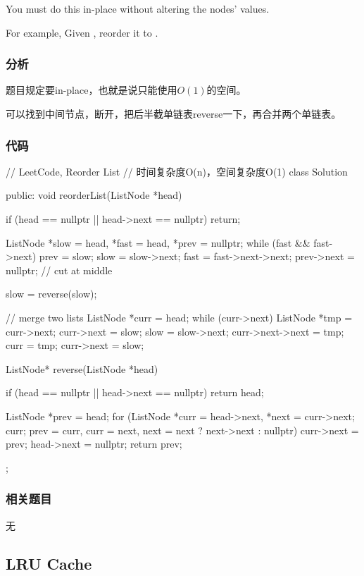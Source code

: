 You must do this in-place without altering the nodes' values.

For example,
Given , reorder it to .


\subsubsection{分析}
题目规定要in-place，也就是说只能使用$O(1)$的空间。

可以找到中间节点，断开，把后半截单链表reverse一下，再合并两个单链表。


\subsubsection{代码}
\begin{Code}
// LeetCode, Reorder List
// 时间复杂度O(n)，空间复杂度O(1)
class Solution {
public:
    void reorderList(ListNode *head) {
        if (head == nullptr || head->next == nullptr) return;

        ListNode *slow = head, *fast = head, *prev = nullptr;
        while (fast && fast->next) {
            prev = slow;
            slow = slow->next;
            fast = fast->next->next;
        }
        prev->next = nullptr; // cut at middle

        slow = reverse(slow);

        // merge two lists
        ListNode *curr = head;
        while (curr->next) {
            ListNode *tmp = curr->next;
            curr->next = slow;
            slow = slow->next;
            curr->next->next = tmp;
            curr = tmp;
        }
        curr->next = slow;
    }

    ListNode* reverse(ListNode *head) {
        if (head == nullptr || head->next == nullptr) return head;

        ListNode *prev = head;
        for (ListNode *curr = head->next, *next = curr->next; curr;
            prev = curr, curr = next, next = next ? next->next : nullptr) {
                curr->next = prev;
        }
        head->next = nullptr;
        return prev;
    }
};
\end{Code}


\subsubsection{相关题目}
\begindot
\item 无
\myenddot


\subsection{LRU Cache}
\label{sec:LRU-Cachet}


